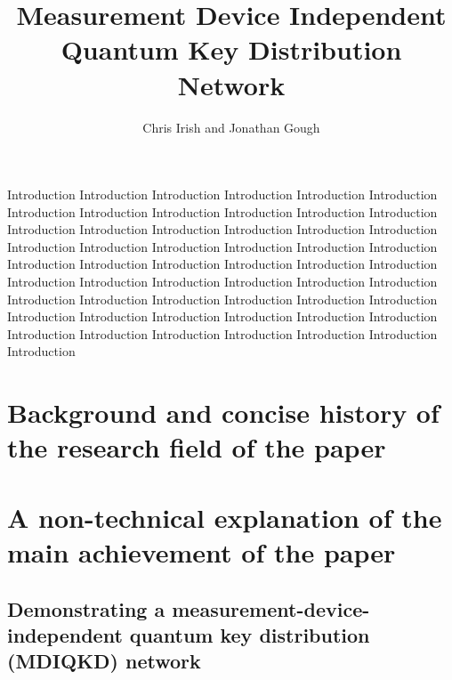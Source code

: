 \documentclass[journal]{vgtc}
\title{Measurement Device Independent Quantum Key Distribution Network}
\author{Chris Irish and Jonathan Gough}
\begin{document}

\maketitle

Introduction Introduction Introduction Introduction Introduction Introduction Introduction Introduction Introduction Introduction Introduction Introduction Introduction Introduction Introduction Introduction Introduction Introduction Introduction Introduction Introduction Introduction Introduction Introduction Introduction Introduction Introduction Introduction Introduction Introduction Introduction Introduction Introduction Introduction Introduction Introduction Introduction Introduction Introduction Introduction Introduction Introduction Introduction Introduction Introduction Introduction Introduction Introduction Introduction Introduction Introduction Introduction Introduction Introduction Introduction   


\section{Background and concise history of the research field of the paper}

\section{A non-technical explanation of the main achievement of the paper}

\subsection*{Demonstrating a measurement-device-independent quantum key distribution (MDIQKD) network}
\end{document}
